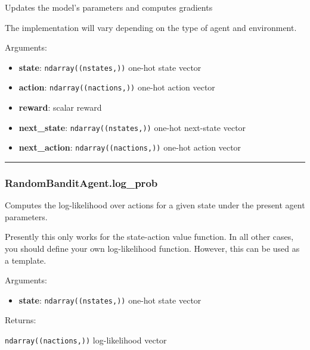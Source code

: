 Updates the model's parameters and computes gradients

The implementation will vary depending on the type of agent and
environment.

Arguments:

\begin{itemize}
\tightlist
\item
  \textbf{state}: \texttt{ndarray((nstates,))} one-hot state vector
\item
  \textbf{action}: \texttt{ndarray((nactions,))} one-hot action vector
\item
  \textbf{reward}: scalar reward
\item
  \textbf{next\_state}: \texttt{ndarray((nstates,))} one-hot next-state
  vector
\item
  \textbf{next\_action}: \texttt{ndarray((nactions,))} one-hot action
  vector
\end{itemize}

\begin{center}\rule{0.5\linewidth}{\linethickness}\end{center}

\subsubsection{RandomBanditAgent.log\_prob}\label{randombanditagent.log_prob}

\begin{Shaded}
\begin{Highlighting}[]
\end{Highlighting}
\end{Shaded}

Computes the log-likelihood over actions for a given state under the
present agent parameters.

Presently this only works for the state-action value function. In all
other cases, you should define your own log-likelihood function.
However, this can be used as a template.

Arguments:

\begin{itemize}
\tightlist
\item
  \textbf{state}: \texttt{ndarray((nstates,))} one-hot state vector
\end{itemize}

Returns:

\texttt{ndarray((nactions,))} log-likelihood vector

